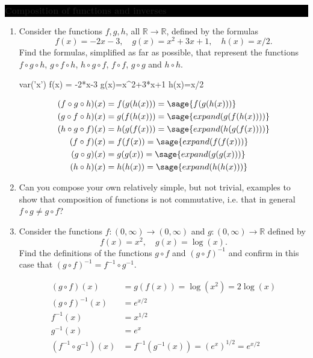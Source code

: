 \documentclass[oneside,10pt]{amsart}
\newcommand{\cbox}[1]{\colorbox{black}{\begin{minipage}{\linewidth}\color{white}\sffamily #1 \end{minipage}}}
\newcommand{\topic}[1]{\cbox{\textbf{#1}}}
\newcounter{pass}
\begin{document}
\topic{Composition of functions  and inverses}
\begin{enumerate}
\setcounter{enumi}{\value{pass}}
\item
Consider the functions $f,g,h$, all $\mathbb{R} \to \mathbb{R}$, defined by the formulas
$$f(x) = -2x -3, \quad g(x) = x^2 + 3x + 1, \quad h(x) = x/2.$$
Find the formulas, simplified as far as possible, that represent the functions
$f \circ g \circ h$, $g \circ f \circ h$, $h \circ g \circ f$, $f \circ f$, $g \circ g$ and $h \circ h$.
\begin{sagesilent}
var('x')
f(x) = -2*x-3
g(x)=x^2+3*x+1
h(x)=x/2
\end{sagesilent}
\begin{solution}
\begin{align*}
(f \circ g \circ h)(x) &= f(g(h(x))) = \sage{f(g(h(x)))}\\
(g \circ f \circ h)(x) &= g(f(h(x))) = \sage{expand(g(f(h(x))))}\\
(h \circ g \circ f)(x) &= h(g(f(x))) = \sage{expand(h(g(f(x))))}\\
(f \circ f)(x) &= f(f(x)) = \sage{expand(f(f(x)))}\\
(g \circ g)(x) &= g(g(x)) = \sage{expand(g(g(x)))}\\
(h \circ h)(x) &= h(h(x)) = \sage{expand(h(h(x)))}\\
\end{align*}
\end{solution}
\item
Can you compose your own relatively simple, but not trivial, examples to show that composition of functions is not commutative, i.e. that in general $f \circ g \neq g \circ f$?
\item
Consider the functions $f: (0,\infty) \to (0, \infty)$ and $g : (0,\infty) \to \mathbb{R}$ defined by
$$f(x) = x^2, \quad g(x) = \log(x).$$
Find the definitions of the functions $g \circ f$ and $(g \circ f)^{-1}$ and confirm in this case that $(g \circ f)^{-1} = f^{-1} \circ g^{-1}$.
\begin{solution}
\begin{align*}
(g \circ f)(x) &= g(f(x)) = \log \left (x^2 \right ) = 2 \log(x)\\
(g \circ f)^{-1}(x) &= e^{x/2} \\
f^{-1}(x) &= x^{1/2}\\
g^{-1}(x) &= e^x\\
(f^{-1} \circ g^{-1})(x) &= f^{-1}(g^{-1}(x)) = \left ( e^x \right )^{1/2} = e^{x/2}
\end{align*}
\end{solution}
\setcounter{pass}{\value{enumi}}
\end{enumerate}
\end{document}

